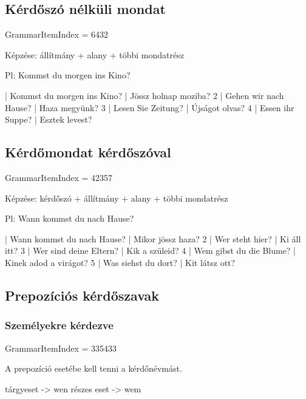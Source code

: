 \documentclass{article}
\newenvironment{desc}{\verbatim}{\endverbatim}
\newenvironment{exmp}{\verbatim}{\endverbatim}
\begin{document}
\subsection{Kérdőszó nélküli mondat}

GrammarItemIndex = 6432

\begin{desc}
Képzése: állítmány + alany + többi mondatrész

Pl: Kommst du morgen ins Kino?
\end{desc}

\begin{exmp}
1 | Kommst du morgen ins Kino? | Jössz holnap moziba?
2 | Gehen wir nach Hause? | Haza megyünk?
3 | Lesen Sie Zeitung? | Újságot olvas?
4 | Essen ihr Suppe? | Esztek levest?
\end{exmp}

\subsection{Kérdőmondat kérdőszóval}

GrammarItemIndex = 42357

\begin{desc}
Képzése: kérdőszó + állítmány + alany + többi mondatrész

Pl: Wann kommst du nach Hause?
\end{desc}

\begin{exmp}
1 | Wann kommst du nach Hause? | Mikor jössz haza?
2 | Wer steht hier? | Ki áll itt?
3 | Wer sind deine Eltern? | Kik a szüleid?
4 | Wem gibst du die Blume? | Kinek adod a virágot?
5 | Was siehst du dort? | Kit látsz ott?
\end{exmp}

\subsection{Prepozíciós kérdőszavak}

\subsubsection{Személyekre kérdezve}

GrammarItemIndex = 335433

\begin{desc}
A prepozíció esetébe kell tenni a kérdőnévmást.

tárgyeset -> wen
részes eset -> wem
\end{desc}
\end{document}
